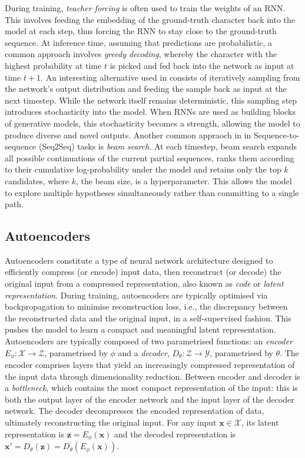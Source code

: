 \documentclass[Main.tex]{subfiles}
\begin{document}
During training, \textit{teacher forcing} is often used to train the weights of an RNN. This involves feeding the embedding of the ground-truth character back into the model at each step, thus forcing the RNN to stay close to the ground-truth sequence. At inference time, assuming that predictions are probabilistic, a common approach involves \textit{greedy decoding}, whereby the character with the highest probability at time $t$ is picked and fed back into the network as input at time $t+1$. An interesting alternative used in \cite{graves_generating_2013} consists of iteratively sampling from the network's output distribution and feeding the sample back as input at the next timestep. While the network itself remains deterministic, this sampling step introduces stochasticity into the model. When RNNs are used as building blocks of generative models, this stochasticity becomes a strength, allowing the model to produce diverse and novel outputs. Another common appraoch in in Sequence-to-sequence (Seq2Seq) tasks is \textit{beam search}. At each timestep, beam search expands all possible continuations of the current partial sequences, ranks them according to their cumulative log-probability under the model and retains only the top $k$ candidates, where $k$, the beam size, is a hyperparameter. This allows the model to explore multiple hypotheses simultaneously rather than committing to a single path.\\

\subsection{Autoencoders}
Autoencoders constitute a type of neural network architecture designed to efficiently compress (or encode) input data, then reconstruct (or decode) the original input from a compressed representation, also known as \textit{code} or \textit{latent representation}. During training, autoencoders are typically optimised via backpropagation to minimise reconstruction loss, i.e., the discrepancy between the reconstructed data and the original input, in a self-supervised fashion. This pushes the model to learn a compact and meaningful latent representation. Autoencoders are typically composed of two parametrised functions: an \textit{encoder} $E_\phi:\mathcal{X}\rightarrow\mathcal{Z}$, parametrised by $\phi$ and a \textit{decoder}, $D_\theta:\mathcal{Z}\rightarrow\mathcal{Y}$, parametrised by $\theta$. The encoder comprises layers that yield an increasingly compressed representation of the input data through dimensionality reduction. Between encoder and decoder is a \textit{bottleneck}, which contains the most compact representation of the input: this is both the output layer of the encoder network and the input layer of the decoder network. The decoder decompresses the encoded representation of data, ultimately reconstructing the original input. For any input $\mathbf{x} \in \mathcal{X}$, its latent representation is $\mathbf{z} = E_\phi(\mathbf{x})$ and the decoded representation is $\mathbf{x}'= D_\theta(\mathbf{z}) = D_\theta(E_\phi(\mathbf{x}))$.\\
\end{document}
